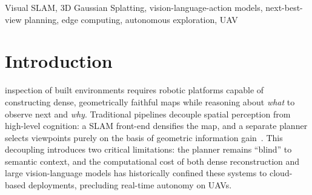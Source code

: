 \documentclass[conference]{IEEEtran}
\begin{document}
\begin{abstract}
Autonomous exploration of complex infrastructures demands the seamless integration of high-fidelity spatial perception with cognitive reasoning capabilities.
This survey systematically reviews the convergence of three rapidly evolving research threads: (i)~visual inertial Simultaneous Localisation and Mapping (VISLAM) augmented with 3D~Gaussian Splatting (3DGS) for real-time, photorealistic scene reconstruction; (ii)~Vision-Language-Action (VLA) foundation models that endow robots with grounded spatial understanding and natural-language instruction following; and (iii)~predictive Next-Best-View (Pred-NBV) planners that minimise exploration entropy under energy-constrained budgets.
We articulate how VLA-driven semantic intelligence can proactively guide metric reconstruction through closed-loop Pred-NBV strategies, reducing flight effort while maximising surface coverage.
Moreover, we analyse the feasibility of deploying these architectures on edge-computing hardware (e.g., NVIDIA~Jetson) via parameter-efficient fine-tuning techniques such as Low-Rank Adaptation (LoRA) and 8-bit quantisation.
A comparative analysis of reconstruction quality, exploration efficiency, cognitive performance, and hardware utilisation metrics consolidates the state of the art and identifies open challenges toward fully autonomous, semantically aware mobile robots and unmanned aerial vehicles (UAVs).
\end{abstract}
\begin{IEEEkeywords}
Visual SLAM, 3D Gaussian Splatting, vision-language-action models, next-best-view planning, edge computing, autonomous exploration, UAV
\end{IEEEkeywords}
\section{Introduction}
\label{sec:introduction}
 inspection of built environments requires robotic platforms capable of constructing dense, geometrically faithful maps while reasoning about \emph{what} to observe next and \emph{why}.
Traditional pipelines decouple spatial perception from high-level cognition: a SLAM front-end densifies the map, and a separate planner selects viewpoints purely on the basis of geometric information gain~\cite{dhami2023prednbv}.
This decoupling introduces two critical limitations: the planner remains ``blind'' to semantic context, and the computational cost of both dense reconstruction and large vision-language models has historically confined these systems to cloud-based deployments, precluding real-time autonomy on UAVs.
\end{document}
